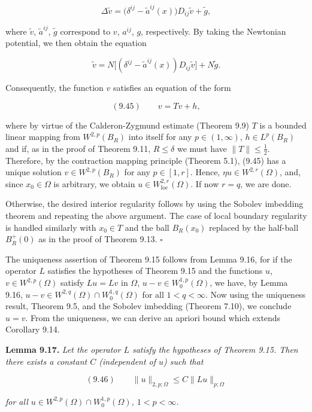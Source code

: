 \[
\Delta \tilde{v} = \bigl(\delta^{ij} - \tilde{a}^{ij}(x)\bigr)D_{ij}\tilde{v} + \tilde{g},
\]

where $\tilde{v}$, $\tilde{a}^{ij}$, $\tilde{g}$ correspond to $v$, $a^{ij}$, $g$, respectively. By taking the Newtonian potential, we then obtain the equation

\[
\tilde{v} = N\bigl[(\delta^{ij} - \tilde{a}^{ij}(x))D_{ij}\tilde{v}\bigr] + N\tilde{g}.
\]



Consequently, the function $v$ satisfies an equation of the form

\[
(9.45)\qquad v = Tv + h,
\]

where by virtue of the Calderon-Zygmund estimate (Theorem 9.9) $T$ is a bounded linear mapping from $W^{2,p}(B_R)$ into itself for any $p \in (1, \infty)$, $h \in L^p(B_R)$ and if, as in the proof of Theorem 9.11, $R \le \delta$ we must have $\|T\| \le \frac{1}{2}$. Therefore, by the contraction mapping principle (Theorem 5.1), (9.45) has a unique solution $v \in W^{2,p}(B_R)$ for any $p \in [1,r]$. Hence, $\eta u \in W^{2,r}(\Omega)$, and, since $x_0 \in \Omega$ is arbitrary, we obtain $u \in W^{2,r}_{\mathrm{loc}}(\Omega)$. If now $r = q$, we are done.

Otherwise, the desired interior regularity follows by using the Sobolev imbedding theorem and repeating the above argument. The case of local boundary regularity is handled similarly with $x_0 \in T$ and the ball $B_R(x_0)$ replaced by the half-ball $B_R^+(0)$ as in the proof of Theorem 9.13. $\square$

The uniqueness assertion of Theorem 9.15 follows from Lemma 9.16, for if the operator $L$ satisfies the hypotheses of Theorem 9.15 and the functions $u$, $v \in W^{2,p}(\Omega)$ satisfy $Lu = Lv$ in $\Omega$, $u - v \in W_0^{1,p}(\Omega)$, we have, by Lemma 9.16, $u - v \in W^{2,q}(\Omega) \cap W_0^{1,q}(\Omega)$ for all $1 < q < \infty$. Now using the uniqueness result, Theorem 9.5, and the Sobolev imbedding (Theorem 7.10), we conclude $u = v$. From the uniqueness, we can derive an apriori bound which extends Corollary 9.14.

\textbf{Lemma 9.17.} \textit{Let the operator $L$ satisfy the hypotheses of Theorem 9.15. Then there exists a constant $C$ (independent of $u$) such that}

\[
(9.46)\qquad \|u\|_{2,p;\Omega} \le C\|Lu\|_{p;\Omega}
\]

\textit{for all $u \in W^{2,p}(\Omega) \cap W_0^{1,p}(\Omega)$, $1 < p < \infty$.}

